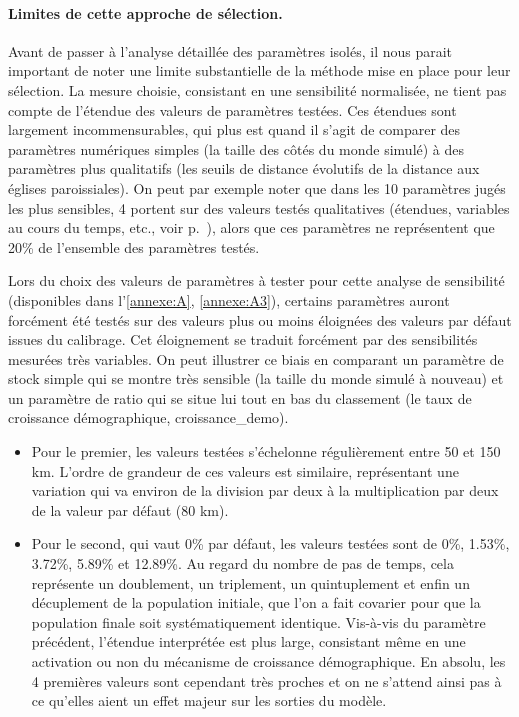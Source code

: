 \paragraph{Limites de cette approche de sélection.}
Avant de passer à l'analyse détaillée des paramètres isolés, il nous parait important de noter une limite substantielle de la méthode mise en place pour leur sélection.
La mesure choisie, consistant en une sensibilité normalisée, ne tient pas compte de l'étendue des valeurs de paramètres testées.
Ces étendues sont largement incommensurables, qui plus est quand il s'agit de comparer des paramètres numériques simples (la taille des côtés du monde simulé) à des paramètres plus qualitatifs (les seuils de distance évolutifs de la distance aux églises paroissiales).
On peut par exemple noter que dans les 10 paramètres jugés les plus sensibles, 4 portent sur des valeurs testés \og qualitatives\fg{} (étendues, variables au cours du temps, etc., voir p.~\pageref{par:etendue-parametres}), alors que ces paramètres ne représentent que 20\% de l'ensemble des paramètres testés.

Lors du choix des valeurs de paramètres à tester pour cette analyse de sensibilité (disponibles dans l'\cref{annexe:A}, \cref{annexe:A3}), certains paramètres auront forcément été testés sur des valeurs plus ou moins éloignées des valeurs par défaut issues du calibrage.
Cet éloignement se traduit forcément par des sensibilités mesurées très variables.
On peut illustrer ce biais en comparant un paramètre de stock simple qui se montre très sensible (la taille du monde simulé à nouveau) et un paramètre de ratio qui se situe lui tout en bas du classement (le taux de croissance démographique, \textsf{croissance\_demo}).
\begin{itemize}
	\item Pour le premier, les valeurs testées s'échelonne régulièrement entre 50 et 150 km.
	L'ordre de grandeur de ces valeurs est similaire, représentant une variation qui va environ de la division par deux à la multiplication par deux de la valeur par défaut (80 km).
	\item Pour le second, qui vaut 0\% par défaut, les valeurs testées sont de 0\%, 1.53\%, 3.72\%, 5.89\% et 12.89\%.
	Au regard du nombre de pas de temps, cela représente un doublement, un triplement, un quintuplement et enfin un décuplement de la population initiale, que l'on a fait covarier pour que la population finale soit systématiquement identique.
 	Vis-à-vis du paramètre précédent, l'étendue interprétée est plus large, consistant même en une activation ou non du mécanisme de croissance démographique.
 	En absolu, les 4 premières valeurs sont cependant très proches et on ne s'attend ainsi pas à ce qu'elles aient un effet majeur sur les sorties du modèle.	
\end{itemize}


